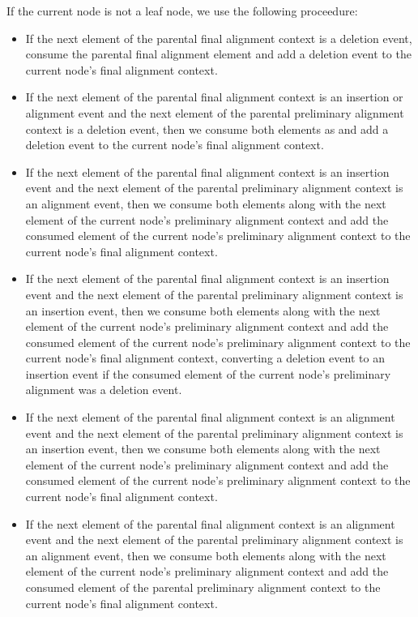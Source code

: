\documentclass[11pt]{article}
\begin{document}
If the current node is not a leaf node, we use the following proceedure:

\begin{itemize}

\item If the next element of the parental final alignment context is a deletion event, consume the parental final alignment element and add a deletion event to the current node's final alignment context.

\item If the next element of the parental final alignment context is an insertion or alignment event and the next element of the parental preliminary alignment context is a deletion event, then we consume both elements as and add a deletion event to the current node's final alignment context.

\item If the next element of the parental final alignment context is an insertion event and the next element of the parental preliminary alignment context is an alignment event, then we consume both elements along with the next element of the current node's preliminary alignment context and add the consumed element of the current node's preliminary alignment context to the current node's final alignment context.

\item If the next element of the parental final alignment context is an insertion event and the next element of the parental preliminary alignment context is an insertion event, then we consume both elements along with the next element of the current node's preliminary alignment context and add the consumed element of the current node's preliminary alignment context to the current node's final alignment context, converting a deletion event to an insertion event if the consumed element of the current node's preliminary alignment was a deletion event.

\item If the next element of the parental final alignment context is an alignment event and the next element of the parental preliminary alignment context is an insertion event, then we consume both elements along with the next element of the current node's preliminary alignment context and add the consumed element of the current node's preliminary alignment context to the current node's final alignment context.

\item If the next element of the parental final alignment context is an alignment event and the next element of the parental preliminary alignment context is an alignment event, then we consume both elements along with the next element of the current node's preliminary alignment context and add the consumed element of the parental preliminary alignment context to the current node's final alignment context.

\end{itemize}
\end{document}
